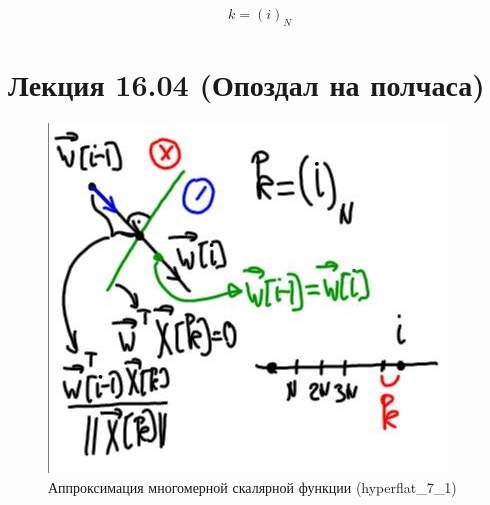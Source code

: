 \documentclass{article}
\numberwithin{equation}{subsection}
\begin{document}
\begin{equation*}
    k = (i)_N
\end{equation*}




\section{Лекция 16.04 (Опоздал на полчаса)}








\begin{figure}[H]
    \centering
    \includegraphics[height=8 cm]{hyperflat_7_1.jpeg}
    \caption{Аппроксимация многомерной скалярной функции (hyperflat\_7\_1)}
    \label{hyperflat_7_1}
\end{figure}
\end{document}
